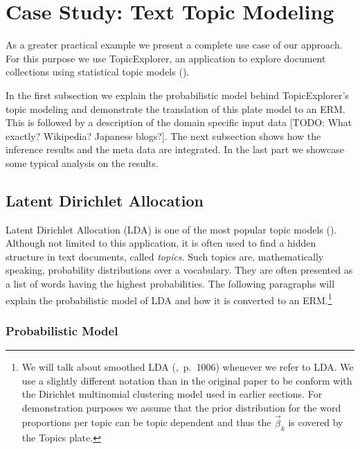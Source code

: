 \section{Case Study: Text Topic Modeling}\label{sec:casestudy}

As a greater practical example we present a complete use case of our approach. For this purpose we use TopicExplorer, an application to explore document collections using statistical topic models (\cite{hinneburg2012topicexplorer}).

In the first subsection we explain the probabilistic model behind TopicExplorer's topic modeling and demonstrate the translation of this plate model to an ERM. This is followed by a description of the domain specific input data [TODO: What exactly? Wikipedia? Japanese blogs?]. The next subsection shows how the inference results and the meta data are integrated. In the last part we showcase some typical analysis on the results.

\subsection{Latent Dirichlet Allocation}

Latent Dirichlet Allocation (LDA) is one of the most popular topic models (\cite{blei2003latent}). Although not limited to this application, it is often used to find a hidden structure in text documents, called \emph{topics}. Such topics are, mathematically speaking, probability distributions over a vocabulary. They are often presented as a list of words having the highest probabilities. The following paragraphs will explain the probabilistic model of LDA and how it is converted to an ERM.\footnote{We will talk about smoothed LDA (\cite{blei2003latent},~p.~1006) whenever we refer to LDA. We use a slightly different notation than in the original paper to be conform with the Dirichlet multinomial clustering model used in earlier sections. For demonstration purposes we assume that the prior distribution for the word proportions per topic can be topic dependent and thus the $\vec \beta_k$ is covered by the Topics plate.}

\subsubsection{Probabilistic Model}

